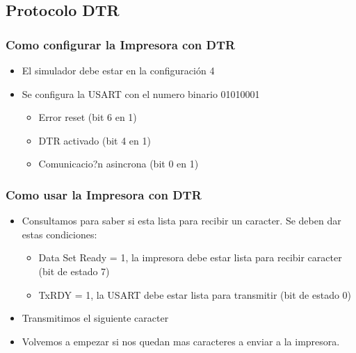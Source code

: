 \documentclass{beamer}
\begin{document}
\subsection{Protocolo DTR}
\begin{frame}[fragile]
\frametitle{Como configurar la Impresora con DTR}
\begin{itemize}
 \item El simulador debe estar en la configuración 4
 \item Se configura la USART con el numero binario 01010001
 \begin{itemize}
 \item Error reset (bit 6 en 1)
 \item DTR activado (bit 4 en 1)
 \item Comunicacio?n asincrona (bit 0 en 1)
\end{itemize}
\end{itemize}

\end{frame}


\begin{frame}[fragile]
\frametitle{Como usar la Impresora con DTR}
\begin{itemize}
 \item  Consultamos para saber si esta lista para recibir un caracter. Se deben dar estas condiciones:
 \begin{itemize}
  \item Data Set Ready = 1, la impresora debe estar lista para recibir caracter (bit de estado 7)
  \item TxRDY = 1, la USART debe estar lista para transmitir (bit de estado 0) 
 \end{itemize}
\item Transmitimos el siguiente caracter 
\item Volvemos a empezar si nos quedan mas caracteres a enviar a la impresora.
\end{itemize}

\end{frame}
\end{document}
